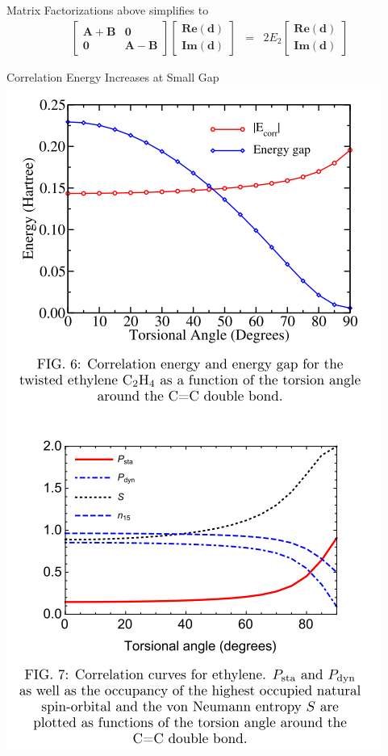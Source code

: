 \documentclass[10pt]{beamer}
\begin{document}
{{{{{{{{{{{{{{{{\begin{frame}{Matrix Factorizations}
  above simplifies to 
  \begin{eqnarray*}
    \begin{bmatrix}
      \mathbf{A + B} & \mathbf{0} \\
      \mathbf{0} & \mathbf{A - B} 
    \end{bmatrix}
    \begin{bmatrix}
      \mathbf{Re(d)} \\
      \mathbf{Im(d)} 
    \end{bmatrix}
    &=& 2E_2   
    \begin{bmatrix}
      \mathbf{Re(d)} \\
      \mathbf{Im(d)} 
    \end{bmatrix}
  \end{eqnarray*}
\end{frame}


\begin{frame}{Correlation Energy Increases at Small Gap}
  \centering
	\includegraphics[width=.4\linewidth]{../figures/gap_vs_corr_Marques.png}
\end{frame}

}}}}}}}}}}}}}}}}
\end{document}
